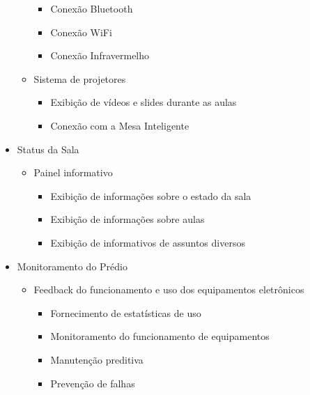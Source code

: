 \begin{apendicesenv}
\begin{itemize}
\begin{itemize}
\begin{itemize}
            \item Conexão Bluetooth
            \item Conexão WiFi
            \item Conexão Infravermelho
        \end{itemize}
        \item Sistema de projetores
        \begin{itemize}
          \item Exibição de vídeos e slides durante as aulas
            \item Conexão com a Mesa Inteligente 
        \end{itemize}
      \end{itemize}
    \item Status da Sala
      \begin{itemize}
        \item Painel informativo
         \begin{itemize}
          \item Exibição de informações sobre o estado da sala
            \item Exibição de informações sobre aulas
            \item Exibição de informativos de assuntos diversos
        \end{itemize}
      \end{itemize}
    \item Monitoramento do Prédio
      \begin{itemize}
        \item Feedback do funcionamento e uso dos equipamentos eletrônicos\begin{itemize}
          \item Fornecimento de estatísticas de uso
            \item Monitoramento do funcionamento de equipamentos
            \item Manutenção preditiva
            \item Prevenção de falhas
        \end{itemize}
        
        
      \end{itemize}
  \end{itemize}

\end{apendicesenv}
